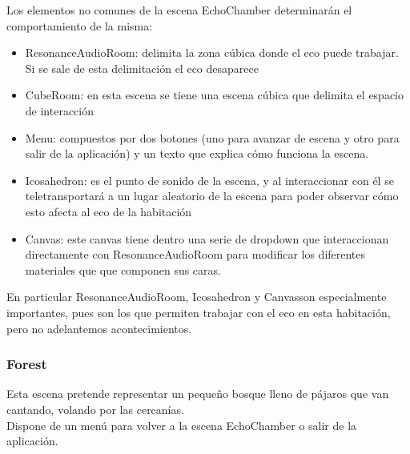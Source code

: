 \quad Los elementos no comunes de la escena EchoChamber determinarán el comportamiento de la misma:
\begin{itemize}
	\item ResonanceAudioRoom: delimita la zona cúbica donde el eco puede trabajar. Si se sale de esta delimitación el eco desaparece
	\item CubeRoom: en esta escena se tiene una escena cúbica que delimita el espacio de interacción
	\item Menu: compuestos por dos botones (uno para avanzar de escena y otro para salir de la aplicación) y un texto que explica cómo funciona la escena.
\item Icosahedron: es el punto de sonido de la escena, y al interaccionar con él se teletransportará a un lugar aleatorio de la escena para poder observar cómo esto afecta al eco de la habitación
\item Canvas: este canvas tiene dentro una serie de dropdown que interaccionan directamente con ResonanceAudioRoom para modificar los diferentes materiales que que componen sus caras.
\end{itemize}

\quad En particular ResonanceAudioRoom, Icosahedron y Canvasson especialmente importantes, pues son los que permiten trabajar con el eco en esta habitación, pero no adelantemos acontecimientos.\\

	\subsubsection{Forest}

\quad Esta escena pretende representar un pequeño bosque lleno de pájaros que van cantando, volando por las cercanías.\\

\quad Dispone de un menú para volver a la escena EchoChamber o salir de la aplicación.\\

